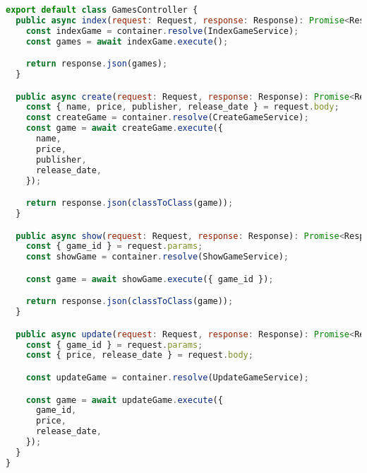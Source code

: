 \begin{lstlisting}[language=JavaScript, caption={Adaptador de Interfaces da Web},captionpos=b, label=alg:gamescontroller]    
export default class GamesController {
  public async index(request: Request, response: Response): Promise<Response> {
    const indexGame = container.resolve(IndexGameService);
    const games = await indexGame.execute();

    return response.json(games);
  }

  public async create(request: Request, response: Response): Promise<Response> {
    const { name, price, publisher, release_date } = request.body;
    const createGame = container.resolve(CreateGameService);
    const game = await createGame.execute({
      name,
      price,
      publisher,
      release_date,
    });

    return response.json(classToClass(game));
  }

  public async show(request: Request, response: Response): Promise<Response> {
    const { game_id } = request.params;
    const showGame = container.resolve(ShowGameService);

    const game = await showGame.execute({ game_id });

    return response.json(classToClass(game));
  }

  public async update(request: Request, response: Response): Promise<Response> {
    const { game_id } = request.params;
    const { price, release_date } = request.body;

    const updateGame = container.resolve(UpdateGameService);

    const game = await updateGame.execute({
      game_id,
      price,
      release_date,
    });
  }
}    
\end{lstlisting}
